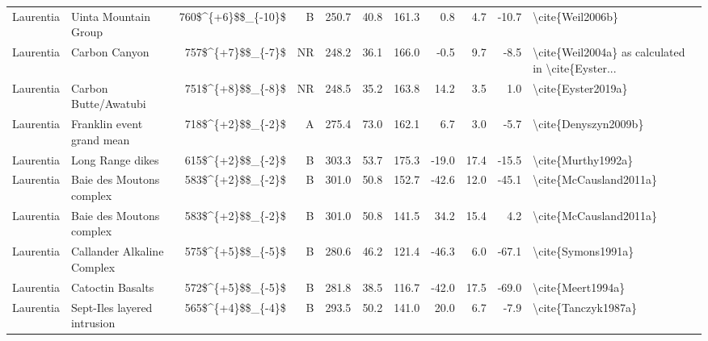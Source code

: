 \begin{longtable}{p{1 in}p{1 in}rrrrrrrr}
                     Laurentia &                             Uinta Mountain Group &     760\$\textasciicircum \{+6\}\$\$\_\{-10\}\$ &      B &     250.7 &      40.8 & 161.3 &   0.8 &       4.7 &       -10.7 &                                   \textbackslash cite\{Weil2006b\} \\
                     Laurentia &                                    Carbon Canyon &      757\$\textasciicircum \{+7\}\$\$\_\{-7\}\$ &     NR &     248.2 &      36.1 & 166.0 &  -0.5 &       9.7 &        -8.5 &  \textbackslash cite\{Weil2004a\} as calculated in \textbackslash cite\{Eyster... \\
                     Laurentia &                             Carbon Butte/Awatubi &      751\$\textasciicircum \{+8\}\$\$\_\{-8\}\$ &     NR &     248.5 &      35.2 & 163.8 &  14.2 &       3.5 &         1.0 &                                 \textbackslash cite\{Eyster2019a\} \\
                     Laurentia &                        Franklin event grand mean &      718\$\textasciicircum \{+2\}\$\$\_\{-2\}\$ &      A &     275.4 &      73.0 & 162.1 &   6.7 &       3.0 &        -5.7 &                               \textbackslash cite\{Denyszyn2009b\} \\
                     Laurentia &                                 Long Range dikes &      615\$\textasciicircum \{+2\}\$\$\_\{-2\}\$ &      B &     303.3 &      53.7 & 175.3 & -19.0 &      17.4 &       -15.5 &                                 \textbackslash cite\{Murthy1992a\} \\
                     Laurentia &                         Baie des Moutons complex &      583\$\textasciicircum \{+2\}\$\$\_\{-2\}\$ &      B &     301.0 &      50.8 & 152.7 & -42.6 &      12.0 &       -45.1 &                             \textbackslash cite\{McCausland2011a\} \\
                     Laurentia &                         Baie des Moutons complex &      583\$\textasciicircum \{+2\}\$\$\_\{-2\}\$ &      B &     301.0 &      50.8 & 141.5 &  34.2 &      15.4 &         4.2 &                             \textbackslash cite\{McCausland2011a\} \\
                     Laurentia &                       Callander Alkaline Complex &      575\$\textasciicircum \{+5\}\$\$\_\{-5\}\$ &      B &     280.6 &      46.2 & 121.4 & -46.3 &       6.0 &       -67.1 &                                 \textbackslash cite\{Symons1991a\} \\
                     Laurentia &                                 Catoctin Basalts &      572\$\textasciicircum \{+5\}\$\$\_\{-5\}\$ &      B &     281.8 &      38.5 & 116.7 & -42.0 &      17.5 &       -69.0 &                                  \textbackslash cite\{Meert1994a\} \\
                     Laurentia &                      Sept-Iles layered intrusion &      565\$\textasciicircum \{+4\}\$\$\_\{-4\}\$ &      B &     293.5 &      50.2 & 141.0 &  20.0 &       6.7 &        -7.9 &                                \textbackslash cite\{Tanczyk1987a\} \\
\end{longtable}
